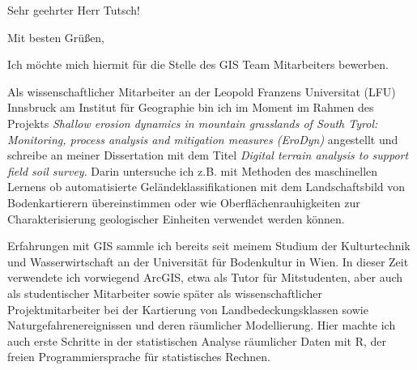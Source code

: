 \documentclass[11pt,a4paper,sans]{moderncv}        %
\begin{document}

\date{15. Dezember 2017}
\opening{Sehr geehrter Herr Tutsch!}
\closing{Mit besten Gr\"{u}{\ss}en,}

\makelettertitle
\justify
Ich m\"ochte mich hiermit f\"ur die Stelle des GIS Team Mitarbeiters bewerben.

Als wissenschaftlicher Mitarbeiter an der Leopold Franzens Universitat (LFU) Innsbruck am Institut f\"ur Geographie bin ich im Moment im Rahmen des Projekts \emph{Shallow erosion dynamics in mountain grasslands of South Tyrol: Monitoring, process analysis and mitigation measures (EroDyn)} angestellt und schreibe an meiner Dissertation mit dem Titel \emph{Digital terrain analysis to support field soil survey}. Darin untersuche ich z.B. mit Methoden des maschinellen Lernens ob automatisierte Gel\"andeklassifikationen mit dem Landschaftsbild von Bodenkartierern \"ubereinstimmen oder wie Oberfl\"achenrauhigkeiten zur Charakterisierung geologischer Einheiten verwendet werden k\"onnen.

Erfahrungen mit GIS sammle ich bereits seit meinem Studium der Kulturtechnik und Wasserwirtschaft an der Universit\"at f\"ur Bodenkultur in Wien. In dieser Zeit verwendete ich vorwiegend ArcGIS, etwa als Tutor f\"ur Mitstudenten, aber auch als studentischer Mitarbeiter sowie sp\"ater als wissenschaftlicher Projektmitarbeiter bei der Kartierung von Landbedeckungsklassen sowie Naturgefahrenereignissen und deren r\"aumlicher Modellierung. Hier machte ich auch erste Schritte in der statistischen Analyse r\"aumlicher Daten mit   R, der freien Programmiersprache f\"{u}r statistisches Rechnen. 
\end{document}

